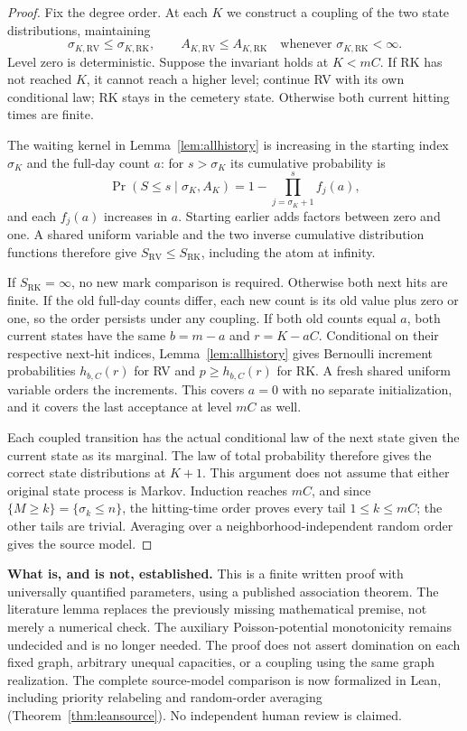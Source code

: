 \documentclass[11pt]{article}
\newcommand{\RV}{\mathrm{RV}}
\newcommand{\RK}{\mathrm{RK}}
\begin{document}
\begin{proof}
Fix the degree order. At each $K$ we construct a coupling of the two
state distributions, maintaining
\[
 \sigma_{K,\RV}\leq\sigma_{K,\RK},\qquad
 A_{K,\RV}\leq A_{K,\RK}
 \quad\text{whenever }\sigma_{K,\RK}<\infty.
\]
Level zero is deterministic. Suppose the invariant holds at $K<mC$.
If RK has not reached $K$, it cannot reach a higher level; continue
RV with its own conditional law; RK stays in the cemetery state.
Otherwise both current hitting times are finite.

The waiting kernel in Lemma~\ref{lem:allhistory} is increasing in
the starting index $\sigma_K$ and the full-day count $a$: for
$s>\sigma_K$ its cumulative probability is
\[
 \Pr(S\leq s\mid\sigma_K,A_K)
       =1-\prod_{j=\sigma_K+1}^s f_j(a),
\]
and each $f_j(a)$ increases in $a$. Starting earlier adds factors
between zero and one. A shared uniform variable and the two inverse
cumulative distribution functions therefore give
$S_\RV\leq S_\RK$, including the atom at infinity.

If $S_\RK=\infty$, no new mark comparison is required. Otherwise
both next hits are finite. If the old full-day counts differ, each
new count is its old value plus zero or one, so the order persists
under any coupling. If both old counts equal $a$, both current states
have the same $b=m-a$ and $r=K-aC$. Conditional on their respective
next-hit indices, Lemma~\ref{lem:allhistory} gives Bernoulli
increment probabilities $h_{b,C}(r)$ for RV and $p\geq h_{b,C}(r)$
for RK. A fresh shared uniform variable orders the increments.
This covers $a=0$ with no separate initialization, and it covers
the last acceptance at level $mC$ as well.

Each coupled transition has the actual conditional law of the next
state given the current state as its marginal. The law of total
probability therefore gives the correct state distributions at $K+1$.
This argument does not assume that either original state process is
Markov. Induction reaches $mC$, and since $\{M\geq k\}=\{\sigma_k\leq n\}$, the hitting-time order
proves every tail $1\leq k\leq mC$; the other tails are trivial.
Averaging over a neighborhood-independent random order gives the
source model.
\end{proof}

\noindent\textbf{What is, and is not, established.}
This is a finite written proof with universally quantified parameters,
using a published association theorem. The literature lemma replaces
the previously missing mathematical premise, not merely a numerical
check. The auxiliary Poisson-potential monotonicity remains undecided
and is no longer needed. The proof does not assert domination on each
fixed graph, arbitrary unequal capacities, or a coupling using the same
graph realization. The complete source-model comparison is now formalized in Lean, including
priority relabeling and random-order averaging (Theorem~\ref{thm:leansource}). No independent human review is claimed.
\end{document}

